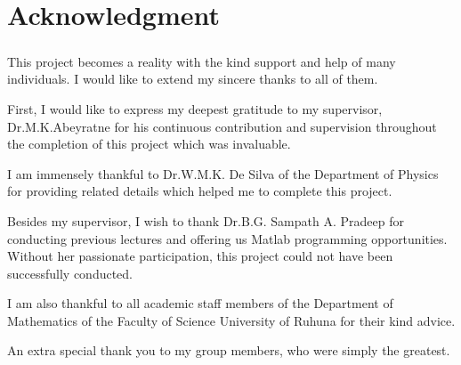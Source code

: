 \chapter*{Acknowledgment}
\paragraph{}
 
This project becomes a reality with the kind support and help of many individuals. I would like to extend my sincere thanks to all of them.

First, I would like to express my deepest gratitude to my supervisor, Dr.M.K.Abeyratne for his continuous contribution and supervision throughout the completion of this project which was invaluable.

I am immensely thankful to Dr.W.M.K. De Silva of the Department of Physics for providing related details which helped me to complete this project.

Besides my supervisor, I wish to thank Dr.B.G. Sampath A. Pradeep for conducting previous lectures and offering us Matlab programming opportunities. Without her passionate participation,
this project could not have been successfully conducted.

I am also thankful to all academic staff members of the Department of Mathematics of the Faculty of Science University of Ruhuna for their kind advice.

An extra special thank you to my group members, who were simply the greatest. 

